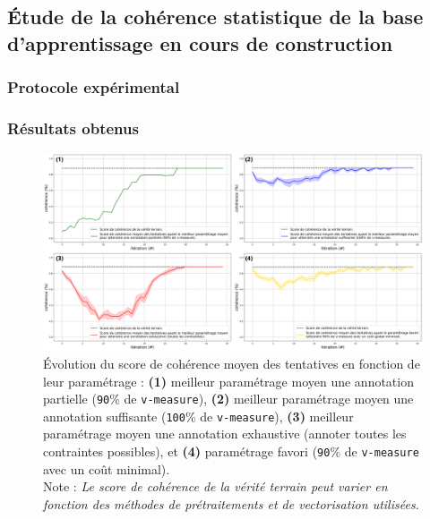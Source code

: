 	\subsection{Étude de la cohérence statistique de la base d'apprentissage en cours de construction}
	
		\subsubsection{Protocole expérimental}

		\subsubsection{Résultats obtenus}
			\begin{figure}[!htb]
				\centering
				\includegraphics[width=\textwidth]{figures/etude-pertinence-consistence-annotation}
				\caption{Évolution du score de cohérence moyen des tentatives en fonction de leur paramétrage : \textbf{(1)} meilleur paramétrage moyen une annotation partielle (\texttt{90}\% de \texttt{v-measure}), \textbf{(2)} meilleur paramétrage moyen une annotation suffisante (\texttt{100}\% de \texttt{v-measure}), \textbf{(3)} meilleur paramétrage moyen une annotation exhaustive (annoter toutes les contraintes possibles), et \textbf{(4)} paramétrage favori (\texttt{90}\% de \texttt{v-measure} avec un coût minimal). \\
				Note : \textit{Le score de cohérence de la vérité terrain peut varier en fonction des méthodes de prétraitements et de vectorisation utilisées.}}
				\label{figure:4.3.1-ETUDE-PERTINENCE-CONHERENCE-ANNOTATION}
			\end{figure}


